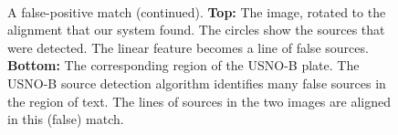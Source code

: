\documentclass[letterpaper]{ut-thesis}%
\newcommand{\captionpart}[1]{\textbf{#1}}
\begin{document}
\begin{figure}[htp]
\begin{center}
\setlength{\fboxsep}{0.5pt}
\setlength{\fboxrule}{0.25pt}
%
\\
\end{center}
\caption{A false-positive match (continued).  \captionpart{Top:} The
image, rotated to the alignment that our system found.  The circles
show the sources that were detected.  The linear feature becomes a
line of false sources.  \captionpart{Bottom:} The corresponding region
of the USNO-B plate.  The USNO-B source detection algorithm identifies
many false sources in the region of text.  The lines of sources in the
two images are aligned in this (false) match.
\label{fig:falseposB}}
\end{figure}
\end{document}

